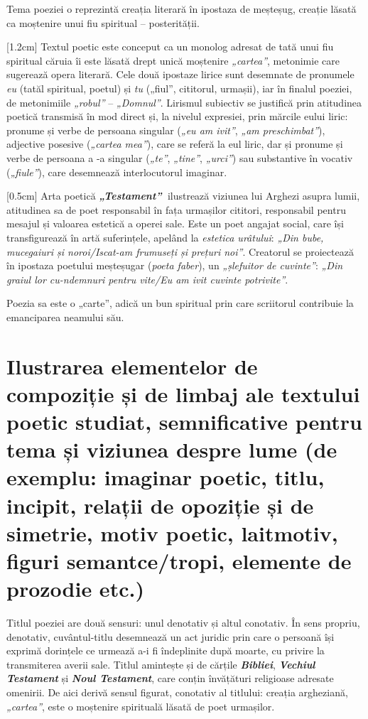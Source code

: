 \documentclass[
12pt,
a4paper
]{article}
\newcommand{\rom}[1]{\uppercase\expandafter{\romannumeral #1\relax}} %
\newcommand{\operatitle}{\textbf{\textit{„Testament”\ }}} %
\begin{document}
Tema poeziei o reprezintă creația literară în ipostaza de meșteșug, creație lăsată ca moștenire unui fiu spiritual -- posterității.

[1.2cm]
Textul poetic este conceput ca un monolog adresat de tată unui fiu spiritual căruia îi este lăsată drept unică moștenire \textit{„cartea”}, metonimie care sugerează opera literară. Cele două ipostaze lirice sunt desemnate de pronumele \textit{eu} (tatăl spiritual, poetul) și \textit{tu} („fiul”, cititorul, urmașii), iar în finalul poeziei, de metonimiile \textit{„robul”} -- \textit{„Domnul”}. Lirismul subiectiv se justifică prin atitudinea poetică transmisă în mod direct și, la nivelul expresiei, prin mărcile eului liric: pronume și verbe de persoana \rom{1} singular (\textit{„eu am ivit”}, \textit{„am preschimbat”}), adjective posesive (\textit{„cartea mea”}), care se referă la eul liric, dar și pronume și verbe de persoana a \rom{2}-a singular (\textit{„te”}, \textit{„tine”}, \textit{„urci”}) sau substantive în vocativ (\textit{„fiule”}), care desemnează interlocutorul imaginar.

[0.5cm]
Arta poetică \operatitle ilustrează viziunea lui Arghezi asupra lumii, atitudinea sa de poet responsabil în fața urmașilor cititori, responsabil pentru mesajul și valoarea estetică a operei sale. Este un poet angajat social, care își transfigurează în artă suferințele, apelând la \textit{estetica urâtului}: \textit{„Din bube, mucegaiuri și noroi/Iscat-am frumuseți și prețuri noi”}. Creatorul se proiectează în ipostaza poetului meșteșugar (\textit{poeta faber}), un \textit{„șlefuitor de cuvinte”}: \textit{„Din graiul lor cu-ndemnuri pentru vite/Eu am ivit cuvinte potrivite”}.

Poezia sa este o „carte”, adică un bun spiritual prin care scriitorul contribuie la emanciparea neamului său.


\section{Ilustrarea elementelor de compoziție și de limbaj ale textului poetic studiat, semnificative pentru tema și viziunea despre lume {\footnotesize (de exemplu: imaginar poetic, titlu, incipit, relații de opoziție și de simetrie, motiv poetic, laitmotiv, figuri semantce/tropi, elemente de prozodie etc.)}}

Titlul poeziei are două sensuri: unul denotativ și altul conotativ. În sens propriu, denotativ, cuvântul-titlu desemnează un act juridic prin care o persoană își exprimă dorințele ce urmează a-i fi îndeplinite după moarte, cu privire la transmiterea averii sale. Titlul amintește și de cărțile \textbf{\textit{Bibliei}}, \textbf{\textit{Vechiul Testament}} și \textbf{\textit{Noul Testament}}, care conțin învățături religioase adresate omenirii. De aici derivă sensul figurat, conotativ al titlului: creația argheziană, \textit{„cartea”}, este o moștenire spirituală lăsată de poet urmașilor.
\end{document}
